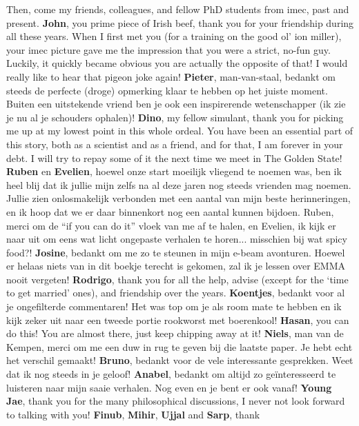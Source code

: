 Then, come my friends, colleagues, and fellow PhD students from imec, past and present. \textbf{John}, you
prime piece of Irish beef, thank you for your friendship during all these years. When I first met you (for a
training on the good ol' ion miller), your imec picture gave me the impression that you were a strict, no-fun
guy. Luckily, it quickly became obvious you are actually the opposite of that! I would really like to hear
that pigeon joke again! \textbf{Pieter}, man-van-staal, bedankt om steeds de perfecte (droge) opmerking klaar
te hebben op het juiste moment. Buiten een uitstekende vriend ben je ook een inspirerende wetenschapper (ik
zie je nu al je schouders ophalen)! \textbf{Dino}, my fellow simulant, thank you for picking me up at my
lowest point in this whole ordeal. You have been an essential part of this story, both as a scientist and as a
friend, and for that, I am forever in your debt. I will try to repay some of it the next time we meet in The
Golden State! \textbf{Ruben} en \textbf{Evelien}, hoewel onze start moeilijk vliegend te noemen was, ben ik
heel blij dat ik jullie mijn zelfs na al deze jaren nog steeds vrienden mag noemen. Jullie zien onlosmakelijk
verbonden met een aantal van mijn beste herinneringen, en ik hoop dat we er daar binnenkort nog een aantal
kunnen bijdoen. Ruben, merci om de ``if you can do it'' vloek van me af te halen, en Evelien, ik kijk er naar
uit om eens wat licht ongepaste verhalen te horen... misschien bij wat spicy food?! \textbf{Josine}, bedankt
om me zo te steunen in mijn e-beam avonturen. Hoewel er helaas niets van in dit boekje terecht is gekomen, zal
ik je lessen over EMMA nooit vergeten! \textbf{Rodrigo}, thank you for all the help, advise (except for the
`time to get married' ones), and friendship over the years. \textbf{Koentjes}, bedankt voor al je ongefilterde
commentaren! Het was top om je als room mate te hebben en ik kijk zeker uit naar een tweede portie rookworst
met boerenkool! \textbf{Hasan}, you can do this! You are almost there, just keep chipping away at it!
\textbf{Niels}, man van de Kempen, merci om me een duw in rug te geven bij die laatste paper. Je hebt echt het
verschil gemaakt! \textbf{Bruno}, bedankt voor de vele interessante gesprekken. Weet dat ik nog steeds in je
geloof! \textbf{Anabel}, bedankt om altijd zo ge\"{i}nteresseerd te luisteren naar mijn saaie verhalen. Nog
even en je bent er ook vanaf! \textbf{Young Jae}, thank you for the many philosophical discussions, I never
not look forward to talking with you! \textbf{Finub}, \textbf{Mihir}, \textbf{Ujjal} and \textbf{Sarp}, thank
